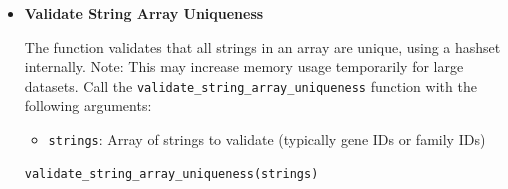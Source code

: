 \documentclass[11pt]{article}
\begin{document}
\begin{enumerate}
\begin{itemize}
\begin{itemize}
	      	      	\item \texttt{expression\_vectors}: 2D array of expression data (samples
	      	      	      × genes)
	      	      	      
	      	      	\item \texttt{family\_centroids}: 2D array of family centroids (samples
	      	      	      × families)
	      	      	      
	      	      	\item \texttt{gene\_to\_fam}: Array mapping each gene to a family index
	      	      	      
	      	      	\item \texttt{n\_genes}: Number of genes
	      	      	      
	      	      	\item \texttt{n\_samples}: Number of samples
	      	      	      
	      	      	\item \texttt{n\_families}: Number of families
	      	      \end{itemize}
	      	      
	      	      \begin{lstlisting}[language=Python, caption={Python Validate Shift Vectors}]
validate_shift_vectors(shift_vectors, expression_vectors, 
                    family_centroids, gene_to_fam, n_genes, 
                    n_samples, n_families)
	      	      \end{lstlisting}
	      	      
	      	\item \textbf{Validate String Array Uniqueness}
	      	      
	      	      The function validates that all strings in an array are unique, using
	      	      a hashset internally. Note: This may increase memory usage temporarily
	      	      for large datasets. Call the \texttt{validate\_string\_array\_uniqueness}
	      	      function with the following arguments:
	      	      
	      	      \begin{itemize}
	      	      	\item \texttt{strings}: Array of strings to validate (typically gene
	      	      	      IDs or family IDs)
	      	      \end{itemize}
	      	      
	      	      \begin{lstlisting}[language=Python, caption={Python Validate String Array Uniqueness}]
validate_string_array_uniqueness(strings)
	      	      \end{lstlisting}
	      	      

\end{itemize}
\end{enumerate}
\end{document}
